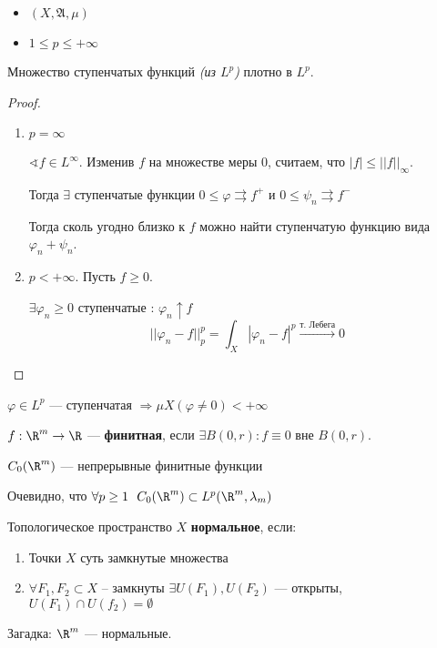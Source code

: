 \begin{lemma}\itemfix
    \begin{itemize}
        \item \((X, \mathfrak{A}, \mu)\)
        \item \(1 \leq p \leq +\infty\)
    \end{itemize}

    Множество ступенчатых функций \textit{(из \(L^p\))} плотно в \(L^p\).
\end{lemma}
\begin{proof}\itemfix
    \begin{enumerate}
        \item \(p = \infty\)

              \(\sphericalangle f\in L^{\infty}\). Изменив \(f\) на множестве меры \(0\), считаем, что \(|f| \leq ||f||_\infty\).

              Тогда \(\exists \) ступенчатые функции \(0 \leq \varphi \rightrightarrows f^{ +}\) и \(0 \leq \psi_n \rightrightarrows f^{ -}\)


              Тогда сколь угодно близко к \(f\) можно найти ступенчатую функцию вида \(\varphi_n + \psi_n\).

        \item \(p < +\infty\). Пусть \(f \geq 0\).

              \(\exists \varphi_{n} \geq 0\) ступенчатые : \(\varphi_n \uparrow f\)
              \[||\varphi_n - f||_p^p = \int_X |\varphi_n - f|^p \xrightarrow{\text{т. Лебега}} 0\]
    \end{enumerate}
\end{proof}
\begin{remark}
    \(\varphi \in L^p\) --- ступенчатая \( \Rightarrow \mu X (\varphi \neq 0) < +\infty\)
\end{remark}

\begin{definition}
    \(f : \R^m \to \R\) --- \textbf{финитная}, если \(\exists B(0, r) : f\equiv 0\) вне \(B(0, r)\).
\end{definition}

\begin{obozn}
    \(C_0(\R^m)\) --- непрерывные финитные функции
\end{obozn}

Очевидно, что \(\forall p \geq 1 \ \ C_0(\R^m) \subset L^p(\R^m, \lambda_m)\)

\begin{definition}
    Топологическое пространство \(X\) \textbf{нормальное}, если:
    \begin{enumerate}
        \item Точки \(X\) суть замкнутые множества
        \item \(\forall F_1, F_2 \subset X\) -- замкнуты \(\exists U(F_1), U(F_2)\) --- открыты, \(U(F_1) \cap U(f_2) = \emptyset\)
    \end{enumerate}
\end{definition}

Загадка: \(\R^m\) --- нормальные.


